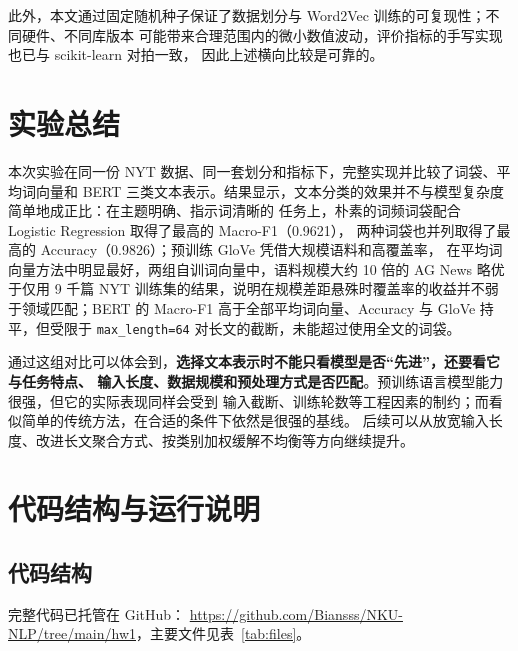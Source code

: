 \documentclass[a4paper]{article}
\begin{document}
此外，本文通过固定随机种子保证了数据划分与 Word2Vec 训练的可复现性；不同硬件、不同库版本
可能带来合理范围内的微小数值波动，评价指标的手写实现也已与 scikit-learn 对拍一致，
因此上述横向比较是可靠的。

\section{实验总结}
\label{sec:conclusion}

本次实验在同一份 NYT 数据、同一套划分和指标下，完整实现并比较了词袋、平均词向量和 BERT
三类文本表示。结果显示，文本分类的效果并不与模型复杂度简单地成正比：在主题明确、指示词清晰的
任务上，朴素的词频词袋配合 Logistic Regression 取得了最高的 Macro-F1（0.9621），
两种词袋也并列取得了最高的 Accuracy（0.9826）；预训练 GloVe 凭借大规模语料和高覆盖率，
在平均词向量方法中明显最好，两组自训词向量中，语料规模大约 10 倍的 AG News 略优于仅用
9 千篇 NYT 训练集的结果，说明在规模差距悬殊时覆盖率的收益并不弱于领域匹配；BERT 的
Macro-F1 高于全部平均词向量、Accuracy 与 GloVe 持平，但受限于 \texttt{max\_length=64}
对长文的截断，未能超过使用全文的词袋。

通过这组对比可以体会到，\textbf{选择文本表示时不能只看模型是否“先进”，还要看它与任务特点、
输入长度、数据规模和预处理方式是否匹配}。预训练语言模型能力很强，但它的实际表现同样会受到
输入截断、训练轮数等工程因素的制约；而看似简单的传统方法，在合适的条件下依然是很强的基线。
后续可以从放宽输入长度、改进长文聚合方式、按类别加权缓解不均衡等方向继续提升。

\appendix
\section{代码结构与运行说明}
\label{sec:appendix}

\subsection{代码结构}

完整代码已托管在 GitHub：
\url{https://github.com/Biansss/NKU-NLP/tree/main/hw1}，主要文件见表~\ref{tab:files}。
\end{document}
